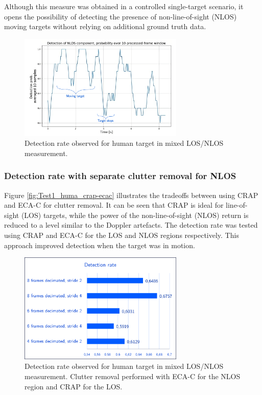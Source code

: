 Although this measure was obtained in a controlled single-target scenario, it opens the possibility of detecting the presence of non-line-of-sight (NLOS) moving targets without relying on additional ground truth data.


\begin{figure}[H]
	\centering
	\includegraphics[width=0.7\textwidth]{Images/Test1/moving_avg-transformed_wtext}
	\caption{Detection rate observed for human target in mixed LOS/NLOS measurement.}
	\label{fig:Test1_moving_avg}
\end{figure}


\subsubsection{Detection rate with separate clutter removal for NLOS}

Figure \ref{fig:Test1_huma_crap-ecac} illustrates the tradeoffs between using CRAP and ECA-C for clutter removal. It can be seen that CRAP is ideal for line-of-sight (LOS) targets, while the power of the non-line-of-sight (NLOS) return is reduced to a level similar to the Doppler artefacts.
The detection rate was tested using CRAP and ECA-C for the LOS and NLOS regions respectively.
This approach improved detection when the target was in motion.

\begin{figure}[H]
	\centering
	\includegraphics[width=0.7\textwidth]{Images/Test1/detect_hist/detect_hist_human_ECAC_LMsans.png}
	\caption{\small Detection rate observed for human target in mixed LOS/NLOS measurement. Clutter removal performed with ECA-C for the NLOS region and CRAP for the LOS.}
	\label{fig:Test1_detect_hist_crap-ecac}
\end{figure}



